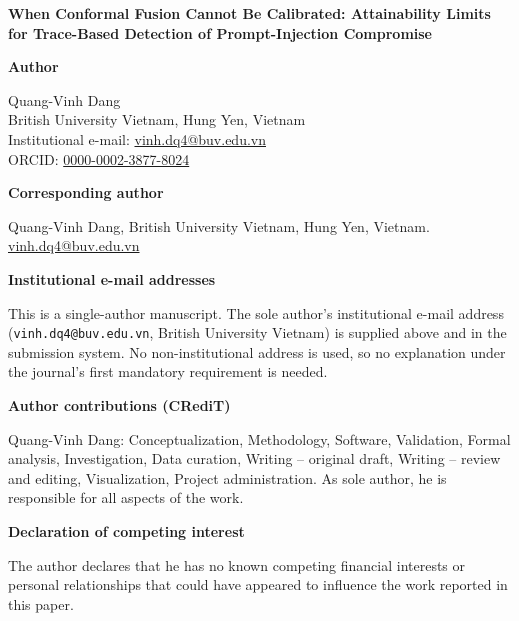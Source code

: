 \documentclass[11pt]{article}
\begin{document}
\begin{center}
{\large\bfseries When Conformal Fusion Cannot Be Calibrated: Attainability Limits
for Trace-Based Detection of Prompt-Injection Compromise}
\end{center}

\vspace{1em}

\noindent\textbf{Author}

\vspace{0.4em}
\noindent
Quang-Vinh Dang\\
British University Vietnam, Hung Yen, Vietnam\\
Institutional e-mail: \href{mailto:vinh.dq4@buv.edu.vn}{vinh.dq4@buv.edu.vn}\\
ORCID: \href{https://orcid.org/0000-0002-3877-8024}{0000-0002-3877-8024}

\vspace{1em}
\noindent\textbf{Corresponding author}

\vspace{0.4em}
\noindent
Quang-Vinh Dang, British University Vietnam, Hung Yen, Vietnam.\\
\href{mailto:vinh.dq4@buv.edu.vn}{vinh.dq4@buv.edu.vn}

\vspace{1em}
\noindent\textbf{Institutional e-mail addresses}

\vspace{0.4em}
\noindent
This is a single-author manuscript. The sole author's institutional e-mail
address (\texttt{vinh.dq4@buv.edu.vn}, British University Vietnam) is supplied
above and in the submission system. No non-institutional address is used, so no
explanation under the journal's first mandatory requirement is needed.

\vspace{1em}
\noindent\textbf{Author contributions (CRediT)}

\vspace{0.4em}
\noindent
Quang-Vinh Dang: Conceptualization, Methodology, Software, Validation, Formal
analysis, Investigation, Data curation, Writing -- original draft, Writing --
review and editing, Visualization, Project administration. As sole author, he is
responsible for all aspects of the work.

\vspace{1em}
\noindent\textbf{Declaration of competing interest}

\vspace{0.4em}
\noindent
The author declares that he has no known competing financial interests or
personal relationships that could have appeared to influence the work reported in
this paper.
\end{document}
